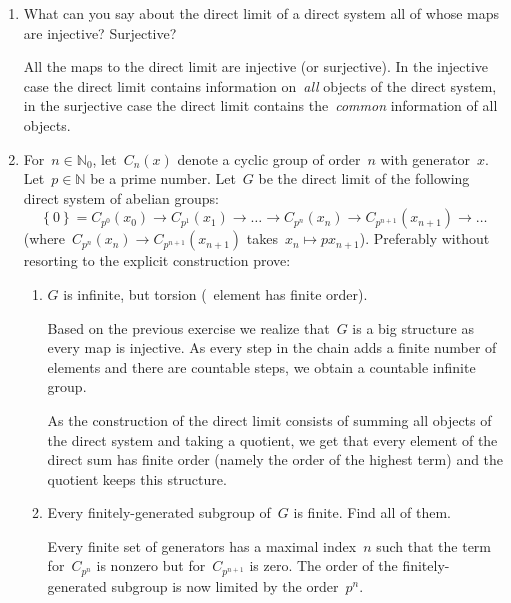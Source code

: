 \documentclass[a4paper,11pt,oneside,openany,article]{memoir}
\begin{document}
\begin{enumerate}
  \item What can you say about the direct limit of a direct system all of whose maps are injective? Surjective?

    \begin{solution}
      All the maps to the direct limit are injective (or surjective). In the injective case the direct limit contains information on~\emph{all} objects of the direct system, in the surjective case the direct limit contains the~\emph{common} information of all objects.
    \end{solution}

  \item For~$n\in\mathbb{N}_0$, let~$C_n(x)$ denote a cyclic group of order~$n$ with generator~$x$. Let~$p\in\mathbb{N}$ be a prime number. Let~$G$ be the direct limit of the following direct system of abelian groups:
    \begin{equation}
      \left\{ 0 \right\}=C_{p^0}(x_0)\rightarrow C_{p^1}(x_1)\rightarrow\ldots\rightarrow C_{p^n}(x_n)\rightarrow C_{p^{n+1}}(x_{n+1})\rightarrow\ldots
    \end{equation}
    (where~$C_{p^n}(x_n)\rightarrow C_{p^{n+1}}(x_{n+1})$ takes~$x_n\mapsto px_{n+1}$). Preferably without resorting to the explicit construction prove:
    \begin{enumerate}
      \item $G$ is infinite, but torsion (\ie~element has finite order).

        \begin{solution}
          Based on the previous exercise we realize that~$G$ is a big structure as every map is injective. As every step in the chain adds a finite number of elements and there are countable steps, we obtain a countable infinite group.

          As the construction of the direct limit consists of summing all objects of the direct system and taking a quotient, we get that every element of the direct sum has finite order (namely the order of the highest term) and the quotient keeps this structure.
        \end{solution}

      \item Every finitely-generated subgroup of~$G$ is finite. Find all of them.

        \begin{solution}
          Every finite set of generators has a maximal index~$n$ such that the term for~$C_{p^n}$ is nonzero but for~$C_{p^{n+1}}$ is zero. The order of the finitely-generated subgroup is now limited by the order~$p^n$.
        \end{solution}
    \end{enumerate}


\end{enumerate}
\end{document}
